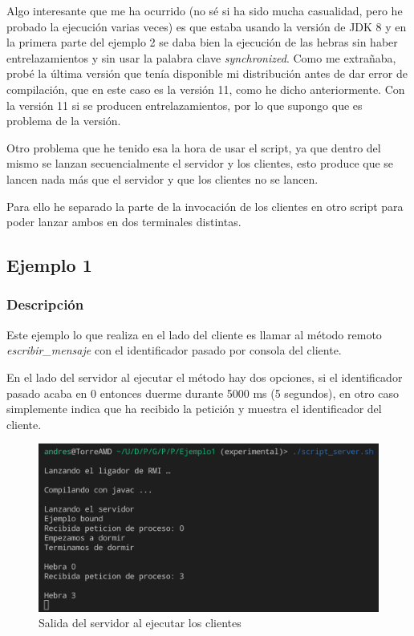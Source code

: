 \documentclass{article}
\begin{document}
\bigskip

Algo interesante que me ha ocurrido (no sé si ha sido mucha casualidad, pero he probado la ejecución varias veces) es que estaba usando la versión de JDK 8 y en la primera parte del ejemplo 2 se daba bien la ejecución de las hebras sin haber entrelazamientos y sin usar la palabra clave \textit{synchronized}. Como me extrañaba, probé la última versión que tenía disponible mi distribución antes de dar error de compilación, que en este caso es la versión 11, como he dicho anteriormente. Con la versión 11 si se producen entrelazamientos, por lo que supongo que es problema de la versión.

\bigskip
Otro problema que he tenido esa la hora de usar el script, ya que dentro del mismo se lanzan secuencialmente el servidor y los clientes, esto produce que se lancen nada más que el servidor y que los clientes no se lancen.

Para ello he separado la parte de la invocación de los clientes en otro script para poder lanzar ambos en dos terminales distintas.

\subsection{Ejemplo 1}
\subsubsection{Descripción}
Este ejemplo lo que realiza en el lado del cliente es llamar al método remoto \textit{escribir\_mensaje} con el identificador pasado por consola del cliente.

En el lado del servidor al ejecutar el método hay dos opciones, si el identificador pasado acaba en 0 entonces duerme durante 5000 ms (5 segundos), en otro caso simplemente indica que ha recibido la petición y muestra el identificador del cliente.

\begin{figure}[H]
    \includegraphics[width=\textwidth]{imagenes/E1S.png}
    \caption{Salida del servidor al ejecutar los clientes}
\end{figure}
\end{document}
